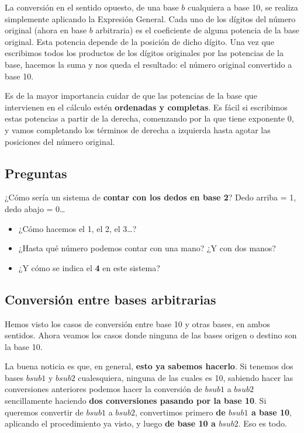 \documentclass[spanish,A4,]{article}
\begin{document}
La conversión en el sentido opuesto, de una base $b$ cualquiera a base
10, se realiza simplemente aplicando la Expresión General. Cada uno de
los dígitos del número original (ahora en base $b$ arbitraria) es el
coeficiente de alguna potencia de la base original. Esta potencia
depende de la posición de dicho dígito. Una vez que escribimos todos los
productos de los dígitos originales por las potencias de la base,
hacemos la suma y nos queda el resultado: el número original convertido
a base 10.

Es de la mayor importancia cuidar de que las potencias de la base que
intervienen en el cálculo estén \textbf{ordenadas y completas}. Es fácil
si escribimos estas potencias a partir de la derecha, comenzando por la
que tiene exponente 0, y vamos completando los términos de derecha a
izquierda hasta agotar las posiciones del número original.

\subsection{Preguntas}\label{preguntas-1}

¿Cómo sería un sistema de \textbf{contar con los dedos en base 2}? Dedo
arriba = 1, dedo abajo = 0\ldots{}

\begin{itemize}
\itemsep1pt\parskip0pt
\item
  ¿Cómo hacemos el 1, el 2, el 3\ldots{}?
\item
  ¿Hasta qué número podemos contar con una mano? ¿Y con dos manos?
\item
  ¿Y cómo se indica el \textbf{4} en este sistema?
\end{itemize}

\subsection{Conversión entre bases
arbitrarias}\label{conversiuxf3n-entre-bases-arbitrarias}

Hemos visto los casos de conversión entre base 10 y otras bases, en
ambos sentidos. Ahora veamos los casos donde ninguna de las bases origen
o destino son la base 10.

La buena noticia es que, en general, \textbf{esto ya sabemos hacerlo}.
Si tenemos dos bases $b sub 1$ y $b sub 2$ cualesquiera, ninguna de las cuales
es 10, sabiendo hacer las conversiones anteriores podemos hacer la
conversión de $b sub 1$ a $b sub 2$ sencillamente haciendo \textbf{dos
conversiones pasando por la base 10}. Si queremos convertir de $b sub 1$ a
$b sub 2$, convertimos primero \textbf{de $b sub 1$ a base 10}, aplicando el
procedimiento ya visto, y luego \textbf{de base 10 a $b sub 2$}. Eso es
todo.
\end{document}
